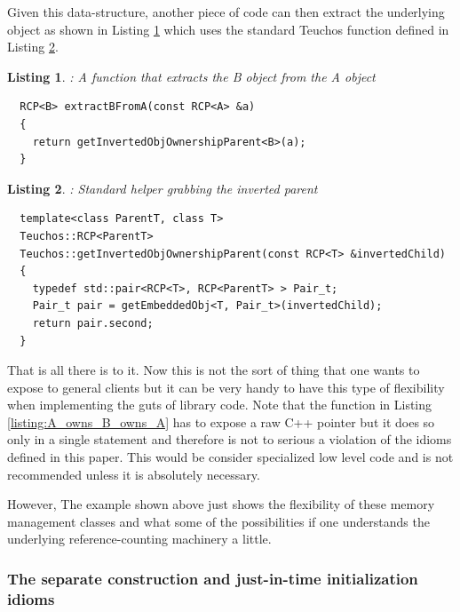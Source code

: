 \documentclass[pdf,ps2pdf,11pt]{SANDreport}
\newtheorem{listing}{Listing}
\begin{document}
Given this data-structure, another piece of code can then extract the
underlying {} object as shown in Listing
{}\ref{listing:Extract_B_from_A} which uses the standard Teuchos
function {} defined in
Listing {}\ref{listing:getInvertedObjOwnershipParent}.

\begin{listing}: A function that extracts the B object from the A object \\
\label{listing:Extract_B_from_A}
{\small\begin{verbatim}
  RCP<B> extractBFromA(const RCP<A> &a)
  {
    return getInvertedObjOwnershipParent<B>(a);
  }
\end{verbatim}}
\end{listing}


\begin{listing}: Standard helper grabbing the inverted parent \\
\label{listing:getInvertedObjOwnershipParent}
{\small\begin{verbatim}
  template<class ParentT, class T>
  Teuchos::RCP<ParentT>
  Teuchos::getInvertedObjOwnershipParent(const RCP<T> &invertedChild)
  {
    typedef std::pair<RCP<T>, RCP<ParentT> > Pair_t;
    Pair_t pair = getEmbeddedObj<T, Pair_t>(invertedChild);
    return pair.second;
  }
\end{verbatim}}
\end{listing}


That is all there is to it.  Now this is not the sort of thing that
one wants to expose to general clients but it can be very handy to
have this type of flexibility when implementing the guts of library
code.  Note that the function {} in Listing
{}\ref{listing:A_owns_B_owns_A} has to expose a raw C++ pointer but it
does so only in a single statement and therefore is not to serious a
violation of the idioms defined in this paper.  This would be consider
specialized low level code and is not recommended unless it is
absolutely necessary.

However, The example shown above just shows the flexibility of these
memory management classes and what some of the possibilities if one
understands the underlying reference-counting machinery a little.


%
{}\subsubsection{The separate construction and just-in-time
initialization idioms}
\label{sec:separate-construct-init}
%
\end{document}
